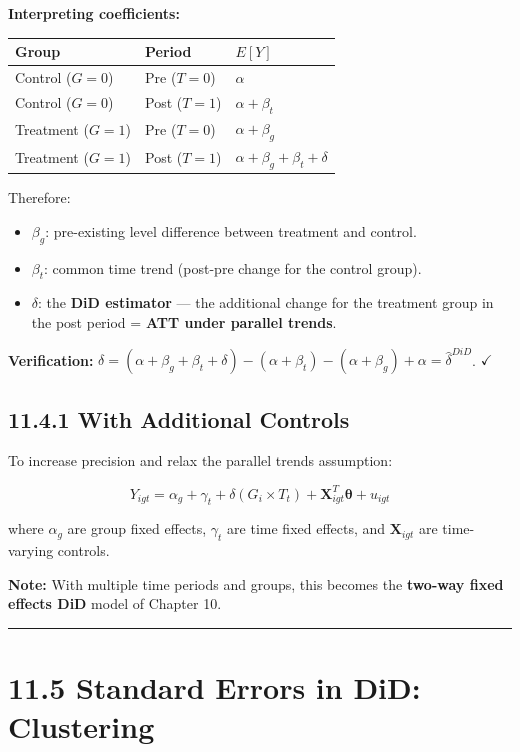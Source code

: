 \textbf{Interpreting coefficients:}

\begin{center}
\begin{tabular}{@{} l l l @{}}
\toprule
\textbf{Group} & \textbf{Period} & \textbf{$E[Y]$} \\
\midrule
Control ($G=0$) & Pre ($T=0$) & $\alpha$ \\
Control ($G=0$) & Post ($T=1$) & $\alpha + \beta_t$ \\
Treatment ($G=1$) & Pre ($T=0$) & $\alpha + \beta_g$ \\
Treatment ($G=1$) & Post ($T=1$) & $\alpha + \beta_g + \beta_t + \delta$ \\
\bottomrule
\end{tabular}
\end{center}

Therefore:
\begin{itemize}
\item $\beta_g$: pre-existing level difference between treatment and control.
\item $\beta_t$: common time trend (post-pre change for the control group).
\item $\delta$: the \textbf{DiD estimator} --- the additional change for the treatment group in the post period = \textbf{ATT under parallel trends}.
\end{itemize}

\textbf{Verification:} $\delta = (\alpha + \beta_g + \beta_t + \delta) - (\alpha + \beta_t) - (\alpha + \beta_g) + \alpha = \hat{\delta}^{DiD}$. $\checkmark$

\subsection{11.4.1 With Additional Controls}

To increase precision and relax the parallel trends assumption:

\[
Y_{igt} = \alpha_g + \gamma_t + \delta (G_i \times T_t) + \mathbf{X}_{igt}^T \boldsymbol{\theta} + u_{igt}
\]

where $\alpha_g$ are group fixed effects, $\gamma_t$ are time fixed effects, and $\mathbf{X}_{igt}$ are time-varying controls.

\textbf{Note:} With multiple time periods and groups, this becomes the \textbf{two-way fixed effects DiD} model of Chapter 10.

\medskip\hrule\medskip

\section{11.5 Standard Errors in DiD: Clustering}

